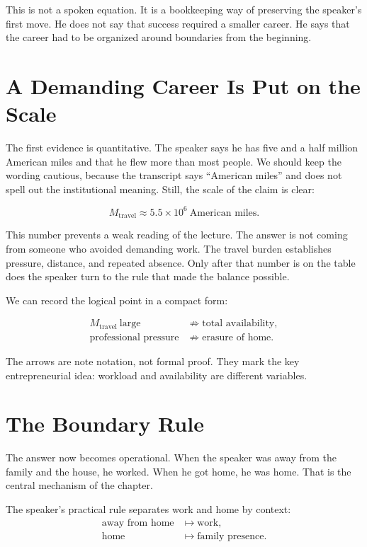 This is not a spoken equation. It is a bookkeeping way of preserving the speaker's first move. He does not say that success required a smaller career. He says that the career had to be organized around boundaries from the beginning.

\section{A Demanding Career Is Put on the Scale}

The first evidence is quantitative. The speaker says he has five and a half million American miles and that he flew more than most people. We should keep the wording cautious, because the transcript says ``American miles'' and does not spell out the institutional meaning. Still, the scale of the claim is clear:

\begin{equation}
M_{\text{travel}}
\approx
5.5\times 10^{6}\ \text{American miles}.
\end{equation}

This number prevents a weak reading of the lecture. The answer is not coming from someone who avoided demanding work. The travel burden establishes pressure, distance, and repeated absence. Only after that number is on the table does the speaker turn to the rule that made the balance possible.

We can record the logical point in a compact form:

\begin{align}
M_{\text{travel}}\ \text{large}
&\not\Rightarrow
\text{total availability},\\
\text{professional pressure}
&\not\Rightarrow
\text{erasure of home}.
\end{align}

The arrows are note notation, not formal proof. They mark the key entrepreneurial idea: workload and availability are different variables.

\section{The Boundary Rule}

The answer now becomes operational. When the speaker was away from the family and the house, he worked. When he got home, he was home. That is the central mechanism of the chapter.

\begin{definition}
The speaker's practical rule separates work and home by context:
\begin{equation}
\begin{aligned}
\text{away from home} &\longmapsto \text{work},\\
\text{home} &\longmapsto \text{family presence}.
\end{aligned}
\end{equation}
\end{definition}

